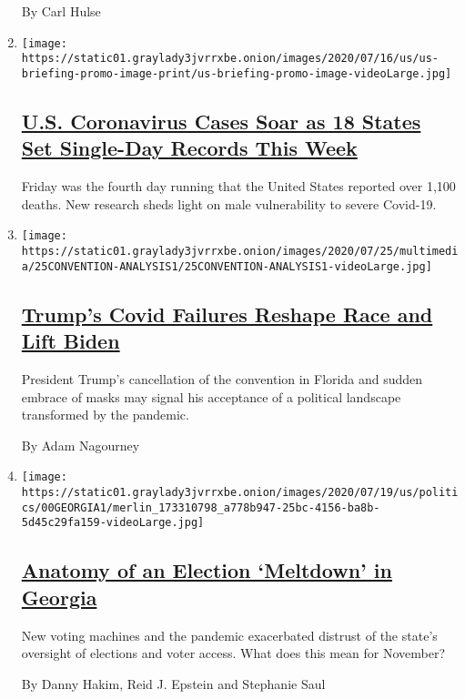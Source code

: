 \begin{enumerate}
  By Carl Hulse
\item
  \texttt{[image: https://static01.graylady3jvrrxbe.onion/images/2020/07/16/us/us-briefing-promo-image-print/us-briefing-promo-image-videoLarge.jpg]}

  \hypertarget{us-coronavirus-cases-soar-as-18-states-set-single-day-records-this-week}{%
  \subsection{\texorpdfstring{\href{/2020/07/25/world/coronavirus-covid-19.html}{U.S.
  Coronavirus Cases Soar as 18 States Set Single-Day Records This
  Week}}{U.S. Coronavirus Cases Soar as 18 States Set Single-Day Records This Week}}\label{us-coronavirus-cases-soar-as-18-states-set-single-day-records-this-week}}

  Friday was the fourth day running that the United States reported over
  1,100 deaths. New research sheds light on male vulnerability to severe
  Covid-19.
\item
  \texttt{[image: https://static01.graylady3jvrrxbe.onion/images/2020/07/25/multimedia/25CONVENTION-ANALYSIS1/25CONVENTION-ANALYSIS1-videoLarge.jpg]}

  \hypertarget{trumps-covid-failures-reshape-race-and-lift-biden}{%
  \subsection{\texorpdfstring{\href{/2020/07/25/us/politics/trump-florida-convention.html}{Trump's
  Covid Failures Reshape Race and Lift
  Biden}}{Trump's Covid Failures Reshape Race and Lift Biden}}\label{trumps-covid-failures-reshape-race-and-lift-biden}}

  President Trump's cancellation of the convention in Florida and sudden
  embrace of masks may signal his acceptance of a political landscape
  transformed by the pandemic.

  By Adam Nagourney
\item
  \texttt{[image: https://static01.graylady3jvrrxbe.onion/images/2020/07/19/us/politics/00GEORGIA1/merlin\_173310798\_a778b947-25bc-4156-ba8b-5d45c29fa159-videoLarge.jpg]}

  \hypertarget{anatomy-of-an-election-meltdown-in-georgia}{%
  \subsection{\texorpdfstring{\href{/2020/07/25/us/politics/georgia-election-voting-problems.html}{Anatomy
  of an Election `Meltdown' in
  Georgia}}{Anatomy of an Election `Meltdown' in Georgia}}\label{anatomy-of-an-election-meltdown-in-georgia}}

  New voting machines and the pandemic exacerbated distrust of the
  state's oversight of elections and voter access. What does this mean
  for November?

  By Danny Hakim, Reid J. Epstein and Stephanie Saul
\end{enumerate}

